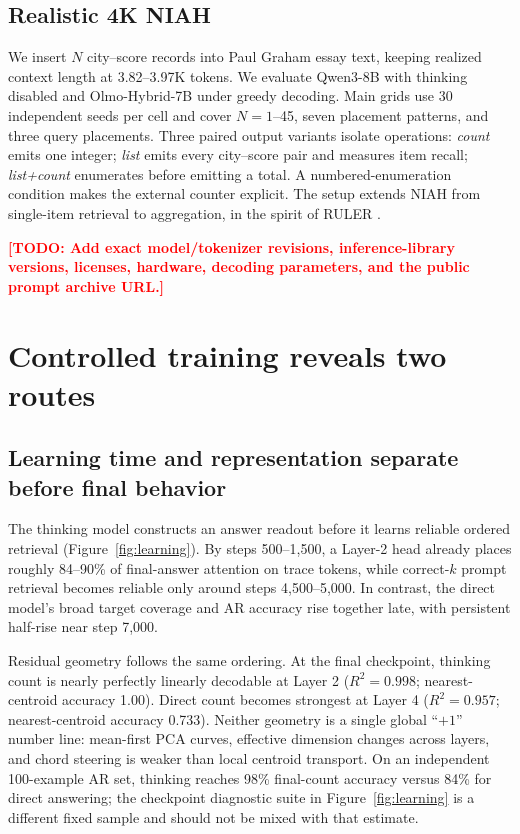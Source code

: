 \documentclass[11pt]{article}
\newcommand{\todo}[1]{\textcolor{red}{\textbf{[TODO: #1]}}}
\begin{document}
\subsection{Realistic 4K NIAH}

We insert $N$ city--score records into Paul Graham essay text, keeping realized context length at 3.82--3.97K tokens. We evaluate Qwen3-8B with thinking disabled \citep{yang2025qwen3} and Olmo-Hybrid-7B \citep{merrill2026olmohybrid} under greedy decoding. Main grids use 30 independent seeds per cell and cover $N=1$--45, seven placement patterns, and three query placements. Three paired output variants isolate operations: \emph{count} emits one integer; \emph{list} emits every city--score pair and measures item recall; \emph{list+count} enumerates before emitting a total. A numbered-enumeration condition makes the external counter explicit. The setup extends NIAH from single-item retrieval to aggregation, in the spirit of RULER \citep{hsieh2024ruler}.

\todo{Add exact model/tokenizer revisions, inference-library versions, licenses, hardware, decoding parameters, and the public prompt archive URL.}

\section{Controlled training reveals two routes}
\label{sec:synthetic}

\subsection{Learning time and representation separate before final behavior}

The thinking model constructs an answer readout before it learns reliable ordered retrieval (Figure~\ref{fig:learning}). By steps 500--1,500, a Layer-2 head already places roughly 84--90\% of final-answer attention on trace tokens, while correct-$k$ prompt retrieval becomes reliable only around steps 4,500--5,000. In contrast, the direct model's broad target coverage and AR accuracy rise together late, with persistent half-rise near step 7,000.

Residual geometry follows the same ordering. At the final checkpoint, thinking count is nearly perfectly linearly decodable at Layer 2 ($R^2=0.998$; nearest-centroid accuracy 1.00). Direct count becomes strongest at Layer 4 ($R^2=0.957$; nearest-centroid accuracy 0.733). Neither geometry is a single global ``$+1$'' number line: mean-first PCA curves, effective dimension changes across layers, and chord steering is weaker than local centroid transport. On an independent 100-example AR set, thinking reaches 98\% final-count accuracy versus 84\% for direct answering; the checkpoint diagnostic suite in Figure~\ref{fig:learning} is a different fixed sample and should not be mixed with that estimate.
\end{document}
